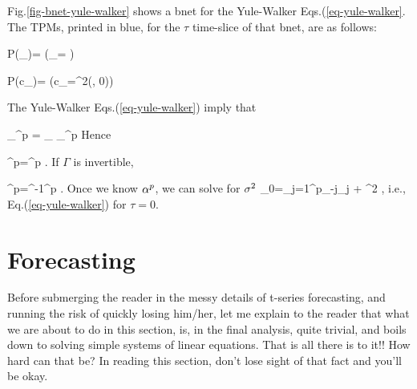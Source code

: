 Fig.\ref{fig-bnet-yule-walker}
shows a bnet
for the
Yule-Walker
Eqs.(\ref{eq-yule-walker}.
The TPMs,
printed in blue, for the
$\tau$ time-slice of that
bnet, are
as follows:

\beq\color{blue}
P(\gamma_\tau)=
\indi\left(\gamma_\tau=
\right)
\eeq

\beq\color{blue}
P(c_\tau)=
\indi(c_\tau=\s^2\delta(\tau, 0))
\eeq


The Yule-Walker
Eqs.(\ref{eq-yule-walker})
imply that


\beq
{}_{\gamma^p}
=
_{\Gamma}
_{\alp^p}
\eeq
Hence

\beq
\gamma^p=\Gamma \alp^p
\;.
\eeq
If $\Gamma$
is invertible,

\beq
\alp^p=\Gamma^{-1}\gamma^p
\;.
\eeq
Once we know $\alpha^p$,
we can solve for $\sigma^2$
\beq
\gamma_0=\sum_{j=1}^p\gamma_{-j}\alp_j
+ \s^2
\;,
\eeq
i.e.,
Eq.(\ref{eq-yule-walker}) for $\tau=0$.



\section{Forecasting}




Before
submerging
the reader
in the messy details
of t-series forecasting,
and running
the risk of quickly losing him/her,
let me explain to the reader that
what we are about
to do in this section, is, in the final
analysis, quite trivial,
and boils down to
solving simple
systems
of linear equations.
That is all there is to it!!
How hard can that be?
In reading this section,
don't lose sight of that fact and
you'll be okay.

